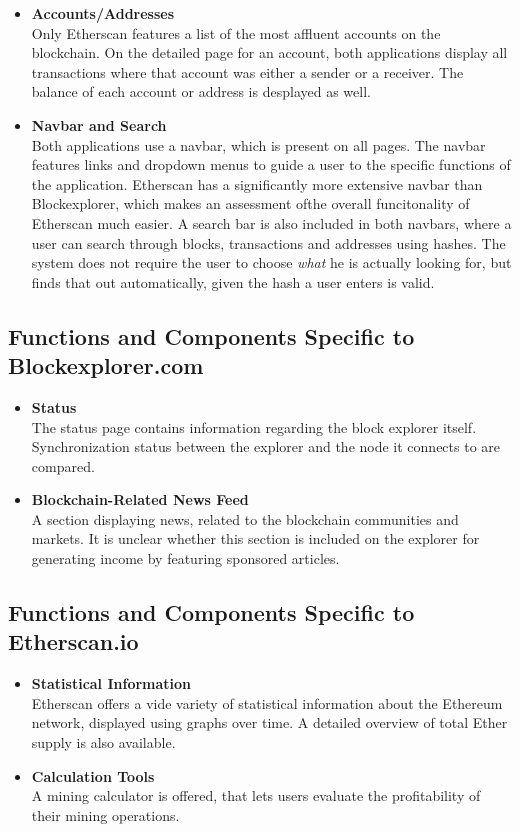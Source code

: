 \begin{itemize}
\item \textbf{Accounts/Addresses}\\
Only Etherscan features a list of the most affluent accounts on the blockchain. On the detailed page for an account, both applications display all transactions where that account was either a sender or a receiver. The balance of each account or address is desplayed as well.
\item \textbf{Navbar and Search}\\
Both applications use a navbar, which is present on all pages. The navbar features links and dropdown menus to guide a user to the specific functions of the application. Etherscan has a significantly more extensive navbar than Blockexplorer, which makes an assessment ofthe overall funcitonality of Etherscan much easier. A search bar is also included in both navbars, where a user can search through blocks, transactions and addresses using hashes. The system does not require the user to choose \emph{what} he is actually looking for, but finds that out automatically, given the hash a user enters is valid.
\end{itemize}

\subsection{Functions and Components Specific to Blockexplorer.com}

\begin{itemize}
\item \textbf{Status}\\
The status page contains information regarding the block explorer itself. Synchronization status between the explorer and the node it connects to are compared.
\item \textbf{Blockchain-Related News Feed}\\
A section displaying news, related to the blockchain communities and markets. It is unclear whether this section is included on the explorer for generating income by featuring sponsored articles.
\end{itemize}

\subsection{Functions and Components Specific to Etherscan.io}

\begin{itemize}
\item \textbf{Statistical Information}\\
Etherscan offers a vide variety of statistical information about the Ethereum network, displayed using graphs over time. A detailed overview of total Ether supply is also available.
\item \textbf{Calculation Tools}\\
A mining calculator is offered, that lets users evaluate the profitability of their mining operations. 
\end{itemize}

